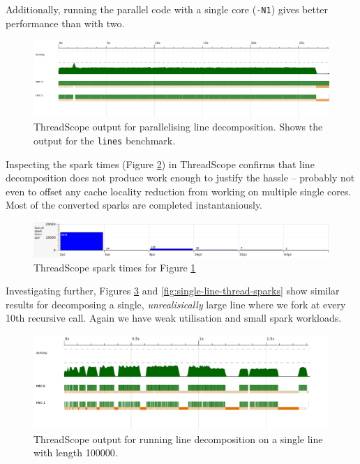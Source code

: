 \documentclass[12pt, a4paper]{article}
\begin{document}
Additionally, running the parallel code with a single core (\texttt{-N1}) gives better performance than with
two.
\begin{figure}[h!]
  \centering
  \includegraphics[width=0.85\linewidth]{../threadscope/lines/single-split}
  \caption{ThreadScope output for parallelising line decomposition. Shows the output for the
    \texttt{lines} benchmark.}
  \label{fig:line-thread}
\end{figure}

Inspecting the spark times (Figure \ref{fig:line-thread-sparks}) in ThreadScope confirms that line
decomposition does not produce work enough to justify the hassle --
probably not even to offset any cache locality reduction from working 
on multiple single cores. Most of the converted sparks are completed instantaniously.

\begin{figure}[h!]
  \centering
  \includegraphics[width=0.85\linewidth]{../threadscope/lines/single-split-spark-times}
  \caption{ThreadScope spark times for Figure \ref{fig:line-thread}}
  \label{fig:line-thread-sparks}
\end{figure}

Investigating further, Figures \ref{fig:single-line-thread} and \ref{fig:single-line-thread-sparks}
show similar results for decomposing a single, \textit{unrealisically} large line where
 we fork at every 10th recursive call. Again we have
 weak utilisation and small spark workloads.

\begin{figure}[h!]
  \centering
  \includegraphics[width=0.85\linewidth]{../threadscope/lines/single-line-every-10}
  \caption{ThreadScope output for running line decomposition on a single line with length
    100000.}
  \label{fig:single-line-thread}
\end{figure}
\end{document}
